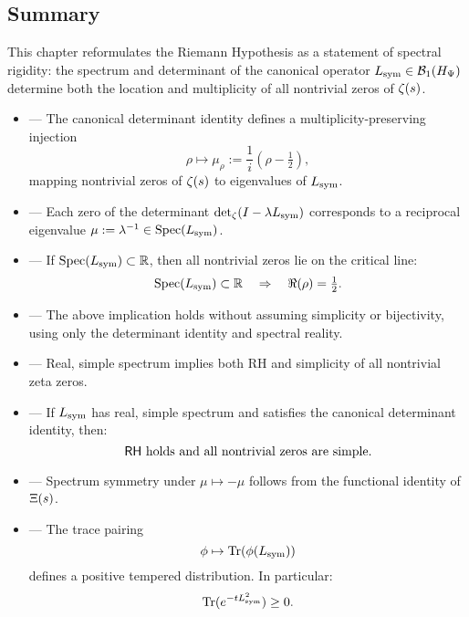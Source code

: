 \subsection*{Summary}

This chapter reformulates the Riemann Hypothesis as a statement of spectral rigidity: the spectrum and determinant of the canonical operator \( L_{\mathrm{sym}} \in \mathcal{B}_1(H_{\Psi}) \) determine both the location and multiplicity of all nontrivial zeros of \( \zeta(s) \).

\begin{itemize}
  \item {} — The canonical determinant identity defines a multiplicity-preserving injection
  \[
  \rho \mapsto \mu_\rho := \frac{1}{i}(\rho - \tfrac{1}{2}),
  \]
  mapping nontrivial zeros of \( \zeta(s) \) to eigenvalues of \( L_{\mathrm{sym}} \).

  \item {} — Each zero of the determinant \( \det\nolimits_\zeta(I - \lambda L_{\mathrm{sym}}) \) corresponds to a reciprocal eigenvalue \( \mu := \lambda^{-1} \in \operatorname{Spec}(L_{\mathrm{sym}}) \).

  \item {} — If \( \operatorname{Spec}(L_{\mathrm{sym}}) \subset \mathbb{R} \), then all nontrivial zeros lie on the critical line:
  \[
  \operatorname{Spec}(L_{\mathrm{sym}}) \subset \mathbb{R} \quad \Rightarrow \quad \Re(\rho) = \tfrac{1}{2}.
  \]

  \item {} — The above implication holds without assuming simplicity or bijectivity, using only the determinant identity and spectral reality.

  \item {} — Real, simple spectrum implies both RH and simplicity of all nontrivial zeta zeros.

  \item {} — If \( L_{\mathrm{sym}} \) has real, simple spectrum and satisfies the canonical determinant identity, then:
  \[
  \mathsf{RH} \text{ holds and all nontrivial zeros are simple.}
  \]

  \item {} — Spectrum symmetry under \( \mu \mapsto -\mu \) follows from the functional identity of \( \Xi(s) \).

  \item {} — The trace pairing
  \[
  \phi \mapsto \operatorname{Tr}(\phi(L_{\mathrm{sym}}))
  \]
  defines a positive tempered distribution. In particular:
  \[
  \operatorname{Tr}(e^{-t L_{\mathrm{sym}}^2}) \ge 0.
  \]


\end{itemize}
